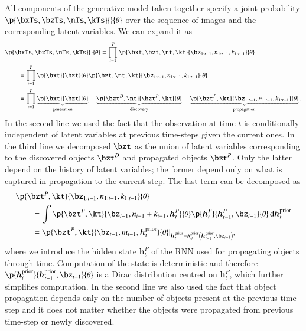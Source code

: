 All components of the generative model taken together specify a joint probability $\p{\bxTs, \bzTs,\nTs,\kTs}{}{\theta}$ over the sequence of images and the corresponding latent variables. We can expand it as
\begin{equation}
\begin{aligned}
    &\p{\bxTs, \bzTs,\nTs,\kTs}{}{\theta} = \prod_{t=1}^T \p{\bxt, \bzt, \nt, \kt}{\bz_{1:t-1}, n_{1:t-1}, k_{1:t-1}}{\theta}\\
%    
    &\qquad= \prod_{t=1}^T \p{\bxt}{\bzt}{\theta} \p{\bzt, \nt, \kt}{\bz_{1:t-1}, n_{1:t-1}, k_{1:t-1}}{\theta}\\
%    
    &\qquad= \prod_{t=1}^T \underbrace{\p{\bxt}{\bzt}{\theta}}_\mathrm{generation} \quad \underbrace{\p{\bzt^D, \nt}{\bzt^P, \kt}{\theta}}_\mathrm{discovery} \quad \underbrace{\p{\bzt^P, \kt}{\bz_{1:t-1}, n_{1:t-1}, k_{1:t-1}}{\theta}}_\mathrm{propagation}.
\end{aligned}
\end{equation}
In the second line we used the fact that the observation at time $t$ is conditionally independent of latent variables at previous time-steps given the current ones. In the third line we decomposed $\bzt$ as the union of latent variables corresponding to the discovered objects $\bzt^D$ and propagated objects $\bzt^P$. Only the latter depend on the history of latent variables; the former depend only on what is captured in propagation to the current step. The last term can be decomposed as
\begin{equation}
\begin{aligned}
&\p{\bzt^P, \kt}{\bz_{1:t-1}, n_{1:t-1}, k_{1:t-1}}{\theta}\\
%
&\qquad= \int \p{\bzt^P, \kt}{\bz_{t-1}, n_{t-1} + k_{t-1}, \bm{h}_t^P}{\theta} \p{\bm{h}_t^P}{\bm{h}_{t-1}^P, \bz_{t-1}}{\theta} \dint \bm{h}_t^\mathrm{prior}\\
%
&\qquad= \p{\bzt^P, \kt}{\bz_{t-1}, m_{t-1}, \bm{h}_t^\mathrm{prior}}{\theta} \lvert_{\bm{h}_t^\mathrm{prior} = R^\mathrm{prior}_\theta \left( \bm{h}_{t-1}^\mathrm{prior}, \bz_{t-1} \right)},
\end{aligned}
\end{equation}
where we introduce the hidden state $\bm{h}_t^P$ of the RNN used for propagating objects through time. Computation of the state is deterministic and therefore $\p{\bm{h}_t^\mathrm{prior}}{\bm{h}_{t-1}^\mathrm{prior}, \bz_{t-1}}{\theta}$ is a Dirac distribution centred on $\bm{h}_t^P$, which further simplifies computation. In the second line we also used the fact that object propagation depends only on the number of objects present at the previous time-step and it does not matter whether the objects were propagated from previous time-step or newly discovered.

